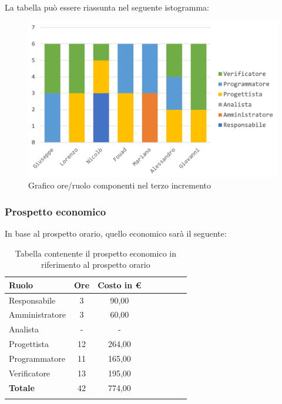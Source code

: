 		La tabella può essere riassunta nel seguente istogramma:
		\begin{figure}[H]
			\centering
			\includegraphics[width=0.8\linewidth]{./images/preventivo/incremento3-1.png}
			\caption{Grafico ore/ruolo componenti nel terzo incremento}
			\label{fig:grafico suddivione ruoli incremento III}
		\end{figure}
		
		\subsubsection{Prospetto economico}
		In base al prospetto orario, quello economico sarà il seguente: 
		
		\begin{longtable}{|l|c|c|c|c|c|c|c|}
			\hline
			\rowcolor{lighter-grayer}
			\textbf{Ruolo} & \textbf{Ore} & \textbf{Costo in € } \\
			\hline
			\endfirsthead
			
			\hline
			Responsabile 	    & 3 & 90,00\\
			\hline 
			\hline
			Amministratore	   & 3 & 60,00\\
			\hline
			\hline
			Analista 				& - & -\\
			\hline
			\hline
			Progettista 		   & 12 & 264,00\\
			\hline
			\hline
			Programmatore 	  & 11 & 165,00\\
			\hline
			\hline
			Verificatore 		   & 13 & 195,00\\
			\hline
			\textbf{Totale} 	 & 42 & 774,00\\
			\hline
			\caption{Tabella contenente il prospetto economico in riferimento al prospetto orario}
		\end{longtable}
		\pagebreak
		
